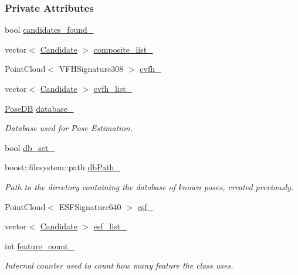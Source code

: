 \subsubsection*{Private Attributes}
\begin{DoxyCompactItemize}
\item 
bool \hyperlink{classPoseEstimation_aa9c90e1b5d640638bdb2f48bd9b9df11}{candidates\-\_\-found\-\_\-}
\item 
vector$<$ \hyperlink{classCandidate}{Candidate} $>$ \hyperlink{classPoseEstimation_a72f85d5bdac0049b35cf932715505f1d}{composite\-\_\-list\-\_\-}
\item 
Point\-Cloud$<$ V\-F\-H\-Signature308 $>$ \hyperlink{classPoseEstimation_a017646ee04a177539a060ab4bd2471f6}{cvfh\-\_\-}
\item 
vector$<$ \hyperlink{classCandidate}{Candidate} $>$ \hyperlink{classPoseEstimation_a173da6a606273315659157e43fe4c3ef}{cvfh\-\_\-list\-\_\-}
\item 
\hyperlink{classPoseDB}{Pose\-D\-B} \hyperlink{classPoseEstimation_a4c10437a72b2b8ac97cf92a55ee12236}{database\-\_\-}
\begin{DoxyCompactList}\small\item\em Database used for Pose Estimation. \end{DoxyCompactList}\item 
bool \hyperlink{classPoseEstimation_a86f675bcf1d652f32c3241f593a981ac}{db\-\_\-set\-\_\-}
\item 
boost\-::filesystem\-::path \hyperlink{classPoseEstimation_acac4c572e8500c78522eb1a741c908cb}{db\-Path\-\_\-}
\begin{DoxyCompactList}\small\item\em Path to the directory containing the database of known poses, created previously. \end{DoxyCompactList}\item 
Point\-Cloud$<$ E\-S\-F\-Signature640 $>$ \hyperlink{classPoseEstimation_ae5c93405275434048b7f81e64f1681d1}{esf\-\_\-}
\item 
vector$<$ \hyperlink{classCandidate}{Candidate} $>$ \hyperlink{classPoseEstimation_a9c3ae4cf6ca9e28a2f715c4cf2974610}{esf\-\_\-list\-\_\-}
\item 
int \hyperlink{classPoseEstimation_ade24adda1bd26f6bdf79b54088069d5d}{feature\-\_\-count\-\_\-}
\begin{DoxyCompactList}\small\item\em Internal counter used to count how many feature the class uses. \end{DoxyCompactList}\item 

\end{DoxyCompactItemize}
